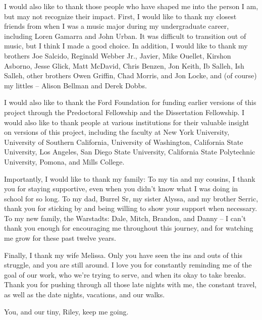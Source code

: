 { %
   I would also like to thank those people who have shaped me into the person I am, but may not recognize their impact. First, I would like to thank my closest friends from when I was a music major during my undergraduate career, including Loren Gamarra and John Urban. It was difficult to transition out of music, but I think I made a good choice. In addition, I would like to thank my brothers Joe Salcido, Reginald Webber Jr., Javier, Mike Ouellet, Kirshon Asborno, Jesse Glick, Matt McDavid, Chris Benzen, Jon Keith, Ib Salleh, Ish Salleh, other brothers Owen Griffin, Chad Morris, and Jon Locke, and (of course) my littles -- Alison Bellman and Derek Dobbs. 
   
   
  
  I would also like to thank the Ford Foundation for funding earlier versions of this project through the Predoctoral Fellowship and the Dissertation Fellowship. I would also like to thank people at various institutions for their valuable insight on versions of this project, including the faculty at New York University, University of Southern California, University of Washington, California State University, Los Angeles, San Diego State University, California State Polytechnic University, Pomona, and Mills College. 
  
  Importantly, I would like to thank my family: To my tia and my cousins, I thank you for staying supportive, even when you didn't know what I was doing in school for so long. To my dad, Burrel Sr, my sister Alyssa, and my brother Serric, thank you for sticking by and being willing to show your support when necessary. To my new family, the Warstadts: Dale, Mitch, Brandon, and Danny -- I can't thank you enough for encouraging me throughout this journey, and for watching me grow for these past twelve years. 
  
  Finally, I thank my wife Melissa. Only you have seen the ins and outs of this struggle, and you are still around. I love you for constantly reminding me of the goal of our work, who we're trying to serve, and when its okay to take breaks. Thank you for pushing through all those late nights with me, the constant travel, as well as the date nights, vacations, and our walks. 
  
  You, and our tiny, Riley, keep me going. 
}


